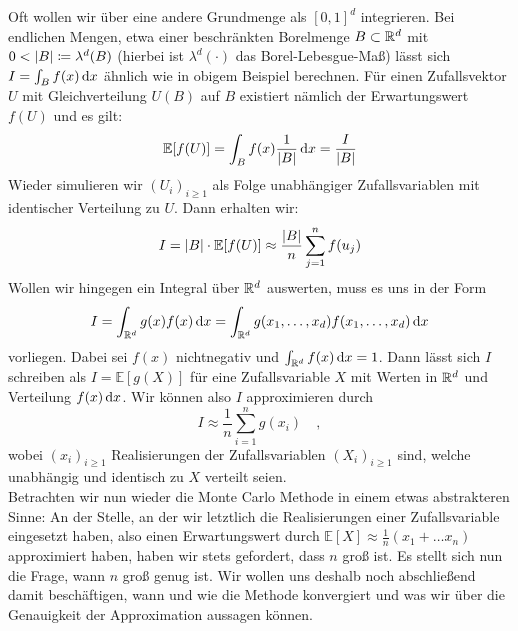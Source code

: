  	Oft wollen wir über eine andere Grundmenge als $ [0,1]^d $ integrieren. 
 	Bei endlichen Mengen, etwa einer beschränkten Borelmenge $ B \subset \mathbb{R}^d $ mit $ 0 < | B | \coloneqq \lambda^d(B) $ (hierbei ist $ \lambda^d(\cdot) $ das Borel-Lebesgue-Maß) lässt sich $ I = \int_{B} f(x) \, \mathrm{d} x $ ähnlich wie in obigem Beispiel berechnen.
	Für einen Zufallsvektor $ U $ mit Gleichverteilung $ U(B) $ auf $ B $ existiert nämlich der Erwartungswert $ f(U) $ und es gilt:
	\[
		\mathbb{E}[f(U)] = \int_{B} f(x) \frac{1}{| B |} \, \mathrm{d} x = \frac{I}{| B |}
	\]
	Wieder simulieren wir $ (U_i)_{i \geq 1} $ als Folge unabhängiger Zufallsvariablen mit identischer Verteilung zu $ U $. Dann erhalten wir:
	\[
		I = | B | \cdot \mathbb{E}[f(U)] \approx \frac{| B |}{n} \sum_{j=1}^{n}f(u_j)
	\]
	 Wollen wir hingegen ein Integral über $ \mathbb{R}^d $ auswerten, muss es uns in der Form 
	\[
	I = \int_{\mathbb{R}^d} g(x)f(x) \, \mathrm{d} x = \int_{\mathbb{R}^d} g(x_1,\dots,x_d)f(x_1,\dots,x_d) \, \mathrm{d} x
	\] 
	vorliegen. Dabei sei $ f(x) $ nichtnegativ und $ \int_{\mathbb{R}^d} f(x) \, \mathrm{d} x = 1 $.
	Dann lässt sich $ I $ schreiben als $ I = \mathbb{E}[g(X)] $ für eine Zufallsvariable $ X $ mit Werten in $ \mathbb{R}^d $ und Verteilung $ f(x) \, \mathrm{d} x $.
	Wir können also $ I $ approximieren durch
	\[
		I \approx \frac{1}{n}\sum_{i=1}^{n} g(x_i) \quad ,
	\]
	wobei $ (x_i)_{i \geq 1} $ Realisierungen der Zufallsvariablen $ (X_i)_{i \geq 1} $ sind, welche unabhängig und identisch zu $ X $ verteilt seien. \\
	Betrachten wir nun wieder die Monte Carlo Methode in einem etwas abstrakteren Sinne:
	An der Stelle, an der wir letztlich die Realisierungen einer Zufallsvariable eingesetzt haben, also einen Erwartungswert durch $
	\mathbb{E}[X] \approx \frac{1}{n}(x_1 + \dots x_n)
	$ approximiert haben, haben wir stets gefordert, dass $ n $ groß ist. 
	Es stellt sich nun die Frage, wann $ n $ groß genug ist.
	Wir wollen uns deshalb noch abschließend damit beschäftigen, wann und wie die Methode konvergiert und was wir über die Genauigkeit der Approximation aussagen können.
